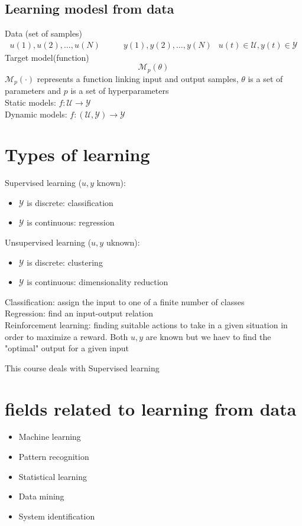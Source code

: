 \documentclass{book}
\theoremstyle{definition}
\theoremstyle{remark}
\theoremstyle{remark}
\begin{document}
\subsection{Learning modesl from data}
Data (set of samples)
\begin{align*}
    u(1), u(2),\dots, u(N) & \qquad y(1), y(2), \dots, y(N) & u(t)\in \mathcal{U},y(t)\in \mathcal{Y}
\end{align*}
Target model(function)
\[\mathcal{M}_p(\theta)
\]
\( \mathcal{M}_p(\cdot)\) represents a function linking input and output samples, $\theta$ is a set of parameters and $p$ is a set of hyperparameters\\
Static models: $f:\mathcal{U}\to\mathcal{Y}$\\
Dynamic models: $f:(\mathcal{U},\mathcal{Y})\to\mathcal{Y}$\\

\section{Types of learning}
Supervised learning ($u,y$ known):
\begin{itemize}
    \item $\mathcal{Y}$ is discrete: classification
    \item  $\mathcal{Y}$ is continuous: regression
\end{itemize}
Unsupervised learning ($u,y$  uknown):
\begin{itemize}
    \item $\mathcal{Y}$ is discrete: clustering
    \item $\mathcal{Y}$ is continuous: dimensionality reduction
\end{itemize}
Classification: assign the input to one of a finite number of classes\\
Regression: find an input-output relation\\
Reinforcement learning: finding suitable actions to take in a given situation in order to maximize a reward. Both $u,y$ are known but we haev to find the "optimal" output for a given input

This course deals with Supervised learning
\section{fields related to learning from data}
\begin{itemize}
    \item Machine learning
    \item Pattern recognition
    \item Statistical learning
    \item Data mining
    \item System identification
\end{itemize}
\end{document}
